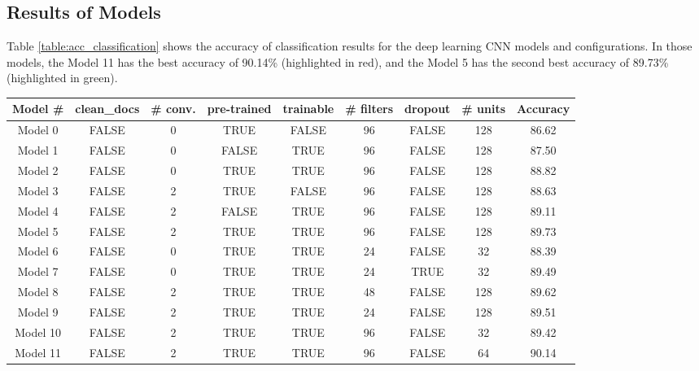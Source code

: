 \documentclass[11pt]{article}
\begin{document}
\subsection{Results of Models}

Table \ref{table:acc_classification} shows the accuracy of classification results for the deep learning CNN models and configurations.
\noindent In those models, the Model 11 has the best accuracy of 90.14\% (highlighted in red), and the Model 5 has the second best accuracy of 89.73\% (highlighted in green). 

\begin{table}[h!]
\centering
\begin{tabular}{||c|c|c|c|c|c|c|c|c||}
\hline
Model \# & clean\_docs &	\# conv.	& pre-trained &	trainable &	\# filters	& dropout &	\# units & Accuracy\\
\hline
Model 0   & FALSE	 & 0	&TRUE	&FALSE	&96	&FALSE	&128 & 86.62\\
\hline
Model 1	&	FALSE	&	0	&	FALSE	&	TRUE	&	96	&	FALSE	&	128	&	87.50\\
\hline
Model 2	&	FALSE	&	0	&	TRUE	&	TRUE	&	96	&	FALSE	&	128	&	88.82\\
\hline
Model 3	&	FALSE	&	2	&	TRUE	&	FALSE	&	96	&	FALSE	&	128	&	88.63\\
\hline
Model 4	&	FALSE	&	2	&	FALSE	&	TRUE	&	96	&	FALSE	&	128	&	89.11\\
\hline
\cellcolor{green!25}Model 5	&	\cellcolor{green!25}FALSE	&	\cellcolor{green!25}2	&	\cellcolor{green!25}TRUE	&	\cellcolor{green!25}TRUE	&	\cellcolor{green!25}96	&	\cellcolor{green!25}FALSE	&	\cellcolor{green!25}128	&	\cellcolor{green!25}89.73\\
\hline
Model	6	&	FALSE	&	0	&	TRUE	&	TRUE	&	24	&	FALSE	&	32	&	88.39	\\
\hline
Model	7	&	FALSE	&	0	&	TRUE	&	TRUE	&	24	&	TRUE	&	32	&	89.49	\\
\hline
Model	8	&	FALSE	&	2	&	TRUE	&	TRUE	&	48	&	FALSE	&	128	&	89.62	\\
\hline
Model	9	&	FALSE	&	2	&	TRUE	&	TRUE	&	24	&	FALSE	&	128	&	89.51	\\
\hline
Model	10	&	FALSE	&	2	&	TRUE	&	TRUE	&	96	&	FALSE	&	32	&	89.42	\\
\hline
\cellcolor{red!25}Model	11	&	\cellcolor{red!25}FALSE	&	\cellcolor{red!25}2	&	\cellcolor{red!25}TRUE	&	\cellcolor{red!25}\cellcolor{red!25}TRUE	&	\cellcolor{red!25}96	&	\cellcolor{red!25}FALSE	&	\cellcolor{red!25}64	&	\cellcolor{red!25}90.14	\\

\end{tabular}
\end{table}
\end{document}
